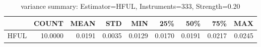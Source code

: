 \begin{table}[ht]
\centering
\caption{variance summary: Estimator=HFUL, Instruments=333, Strength=0.20}
\begin{tabular}{lrrrrrrrr}
\toprule
 & COUNT & MEAN & STD & MIN & 25\% & 50\% & 75\% & MAX \\
\midrule
HFUL & 10.0000 & 0.0191 & 0.0035 & 0.0129 & 0.0170 & 0.0191 & 0.0217 & 0.0245 \\
\bottomrule
\end{tabular}
\end{table}

